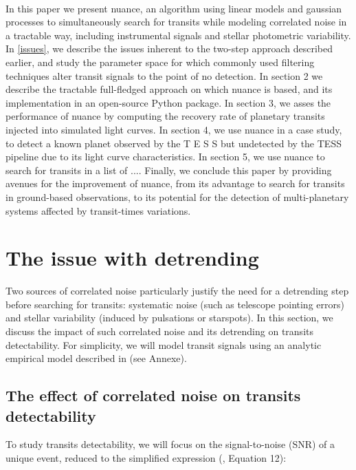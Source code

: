 \documentclass{aastex631}
\begin{document}
\bigskip\\
In this paper we present nuance, an algorithm using linear models and gaussian processes to simultaneously search for transits while modeling correlated noise in a tractable way, including instrumental signals and stellar photometric variability. In \autoref{issues}, we describe the issues inherent to the two-step approach described earlier, and study the parameter space for which commonly used filtering techniques alter transit signals to the point of no detection. In section 2 we describe the tractable full-fledged approach on which nuance is based, and its implementation in an open-source Python package. In section 3, we asses the performance of nuance by computing the recovery rate of planetary transits injected into simulated light curves. In section 4, we use nuance in a case study, to detect a known planet observed by the T E S S but undetected by the TESS pipeline due to its light curve characteristics. In section 5, we use nuance to search for transits in a list of .... Finally, we conclude this paper by providing avenues for the improvement of nuance, from its advantage to search for transits in ground-based observations, to its potential for the detection of multi-planetary systems affected by transit-times variations.

\newpage
\section{The issue with detrending}\label{issues}
Two sources of correlated noise particularly justify the need for a detrending step before searching for transits: systematic noise (such as telescope pointing errors) and stellar variability (induced by  pulsations or starspots). In this section, we discuss the impact of such correlated noise and its detrending on transits detectability. For simplicity, we will model transit signals using an analytic empirical model described in \citealt{protopapas} (see Annexe). 
\bigskip\\ 

\subsection{The effect of correlated noise on transits detectability}

To study transits detectability, we will focus on the signal-to-noise (SNR) of a unique event, reduced to the simplified expression (\citealt{pont2006}, Equation 12):
\end{document}
